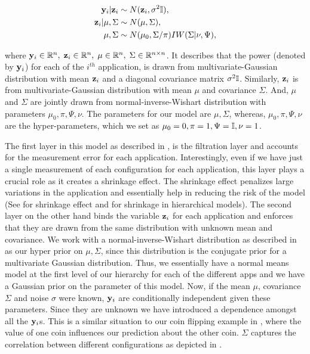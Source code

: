 \begin{equation}
\begin{aligned}
\mathbf{y}_i \vert \mathbf{z}_i  &\sim N( \mathbf{z}_i, \sigma^2 \mathbb{I}),\\
\mathbf{z}_i \vert \mu,\Sigma &\sim N(\mu, \Sigma),\\
\mu, \Sigma &\sim N(\mu_0,\Sigma / \pi)IW(\Sigma | \nu, \Psi),
\end{aligned}
\label{eq:HBN}
\end{equation}

where $\mathbf{y}_i \in \mathbb{R}^n, \; 
\mathbf{z}_i \in \mathbb{R}^n, \; 
\mu \in \mathbb{R}^{n}, \;
\Sigma \in \mathbb{R}^{n\times n}$. It describes that the power (denoted by $\mathbf{y}_i$) for each of the $i^{th}$ application,  is drawn from multivariate-Gaussian distribution with mean $\mathbf{z}_i$ and a diagonal covariance matrix $\sigma^2\mathbb{I}$. Similarly, $\mathbf{z}_i$ is from multivariate-Gaussian distribution with mean $\mu$ and covariance $\Sigma$. And, $\mu$ and $\Sigma$ are jointly drawn from normal-inverse-Wishart distribution with parameters  $\mu_0, \pi,\Psi, \nu$. The parameters for our model are $\mu,\Sigma$, whereas,  $\mu_0, \pi,\Psi, \nu$ are the hyper-parameters, which we set as $\mu_0 = 0, \pi = 1,\Psi = \mathbb{I}, \nu = 1$. 

The first layer in this model as described in , is the filtration layer and accounts for the measurement error for each application. Interestingly, even if we have just a single measurement of each configuration for each application, this layer plays a crucial role as it creates a shrinkage effect. The shrinkage effect penalizes large variations in the application and essentially help in reducing the risk of the model (See \cite{efron1975data} for  shrinkage effect and \cite{morris1983parametric} for shrinkage in hierarchical models). The second layer on the other hand binds the variable $\mathbf{z}_i$ for each application and
enforces that they are drawn from the same distribution with unknown
mean and covariance. We work with a normal-inverse-Wishart distribution as described in \cite{gelman2013bayesian} as our hyper prior on $\mu, \Sigma$, since this distribution is the conjugate prior for a multivariate Gaussian distribution. 
Thus, we essentially have a normal means model at
the first level of our hierarchy for each of the different apps and we
have a Gaussian prior on the parameter of this model. Now, if the mean
$\mu$, covariance $\Sigma$ and noise $\sigma$ were known, $\mathbf{y}_i$ are
conditionally independent given these parameters. Since they are
unknown we have introduced a dependence amongst all the $\mathbf{y}_i$s. This
is a similar situation to our coin flipping example in , where the value of one coin influences our prediction
about the other coin. $\Sigma$ captures the correlation between different configurations as depicted in .



